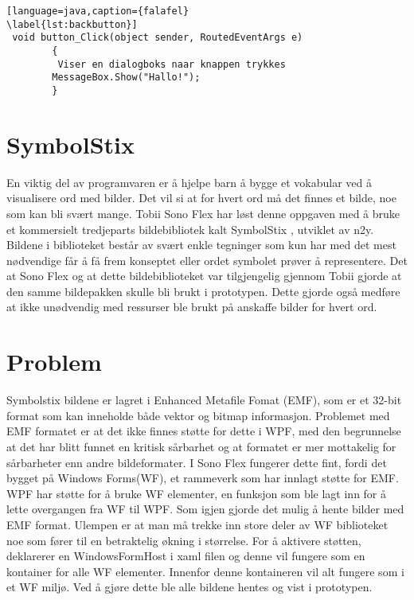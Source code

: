 \begin{lstlisting}[language=java,caption={falafel}
\label{lst:backbutton}]
 void button_Click(object sender, RoutedEventArgs e)
        {
         Viser en dialogboks naar knappen trykkes
        MessageBox.Show("Hallo!");
        }
\end{lstlisting}





\section{SymbolStix}

En viktig del av programvaren er å hjelpe barn å bygge et vokabular ved å visualisere ord med bilder. Det vil si at for hvert ord må det finnes et bilde, noe som kan bli svært mange. Tobii Sono Flex har løst denne oppgaven med å bruke et kommersielt tredjeparts bildebibliotek kalt SymbolStix \cite{n2y}, utviklet av n2y. Bildene i biblioteket består av svært enkle tegninger som kun har med det mest nødvendige får å få frem konseptet eller ordet symbolet prøver å representere. Det at Sono Flex og at dette bildebiblioteket var tilgjengelig gjennom Tobii gjorde at den samme bildepakken skulle bli brukt i prototypen. Dette gjorde også medføre at ikke unødvendig med ressurser ble brukt på anskaffe bilder for hvert ord.


\section{Problem}

Symbolstix bildene er lagret i Enhanced Metafile Fomat (EMF), som er et 32-bit format som kan inneholde både vektor og bitmap informasjon\cite{AboutEMF}. Problemet med EMF formatet er at det ikke finnes støtte for dette i WPF, med den begrunnelse at det har blitt funnet en kritisk sårbarhet\cite{EMFVulnerability} og at formatet er mer mottakelig for sårbarheter\cite{EMFForum} enn andre bildeformater. I Sono Flex fungerer dette fint, fordi det bygget på Windows Forms(WF),  et rammeverk som har innlagt støtte for EMF. WPF har støtte for å bruke WF elementer,  en funksjon som ble lagt inn for å lette overgangen fra WF til WPF. Som igjen gjorde det mulig å hente bilder med EMF format. Ulempen er at man må trekke inn store deler av WF biblioteket noe som fører til en betraktelig økning i størrelse. For å aktivere støtten, deklarerer en WindowsFormHost i xaml filen og denne vil fungere som en kontainer for alle WF elementer. Innenfor denne kontaineren vil alt fungere som i et WF miljø. Ved å gjøre dette ble alle bildene hentes og vist i prototypen. 

